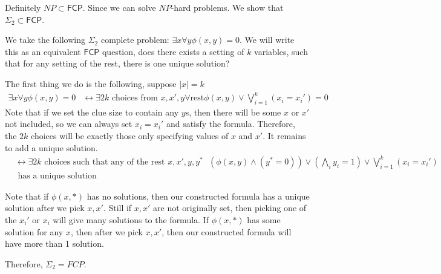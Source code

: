 \documentclass[runningheads,a4paper]{llncs}
\begin{document}
Definitely $NP \subset \mathsf{FCP}$. Since we can solve $NP$-hard problems. We show that $\Sigma_2 \subset \mathsf{FCP}$. 

We take the following $\Sigma_2$ complete problem: $\exists x \forall y \phi(x,y) = 0$. We will write this as an equivalent $\mathsf{FCP}$ question, does there exists a setting of $k$ variables, such that for any setting of the rest, there is one unique solution?

The first thing we do is the following, suppose $|x| = k$
\begin{align}
\exists x \forall y \phi(x,y) = 0 &\leftrightarrow \exists 2k \text{ choices from $x, x', y$} \forall \text{rest} \phi(x,y) \vee \bigvee_{i=1}^k (x_i = x_i') = 0
\end{align}
Note that if we set the clue size to contain any $y$s, then there will be some $x$ or $x'$ not included, so we can always set $x_i = x_i'$ and satisfy the formula. Therefore, the $2k$ choices will be exactly those only specifying values of $x$ and $x'$. It remains to add a unique solution.
\begin{align}
& \leftrightarrow \exists 2k \text{ choices such that any of the rest $x, x', y, y^*$ } (\phi(x,y) \wedge (y^* = 0)) \vee (\bigwedge_i y_i=1) \vee  \bigvee_{i=1}^k (x_i = x_i') \\
	& \text{ has a unique solution}
\end{align}

Note that if $\phi(x,*)$ has no solutions, then our constructed formula has a unique solution after we pick $x, x'$. Still if $x, x'$ are not originally set, then picking one of the $x_i'$ or $x_i$ will give many solutions to the formula. If $\phi(x, *)$ has some solution for any $x$, then after we pick $x, x'$, then our constructed formula will have more than 1 solution. 

Therefore, $\Sigma_2 = FCP$. 
\end{document}

